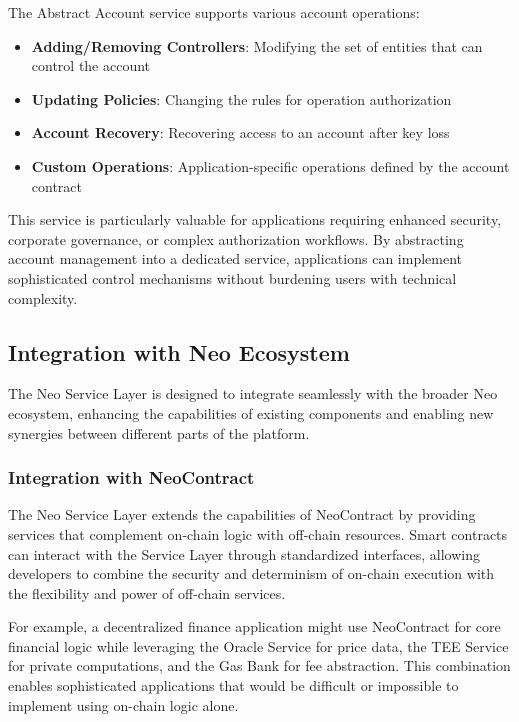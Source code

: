 The Abstract Account service supports various account operations:

\begin{itemize}
    \item \textbf{Adding/Removing Controllers}: Modifying the set of entities that can control the account
    \item \textbf{Updating Policies}: Changing the rules for operation authorization
    \item \textbf{Account Recovery}: Recovering access to an account after key loss
    \item \textbf{Custom Operations}: Application-specific operations defined by the account contract
\end{itemize}

This service is particularly valuable for applications requiring enhanced security, corporate governance, or complex authorization workflows. By abstracting account management into a dedicated service, applications can implement sophisticated control mechanisms without burdening users with technical complexity.

\subsection{Integration with Neo Ecosystem}
\label{subsec:nsl-integration}

The Neo Service Layer is designed to integrate seamlessly with the broader Neo ecosystem, enhancing the capabilities of existing components and enabling new synergies between different parts of the platform.



\subsubsection{Integration with NeoContract}
\label{subsubsec:neocontract-integration}

The Neo Service Layer extends the capabilities of NeoContract by providing services that complement on-chain logic with off-chain resources. Smart contracts can interact with the Service Layer through standardized interfaces, allowing developers to combine the security and determinism of on-chain execution with the flexibility and power of off-chain services.

For example, a decentralized finance application might use NeoContract for core financial logic while leveraging the Oracle Service for price data, the TEE Service for private computations, and the Gas Bank for fee abstraction. This combination enables sophisticated applications that would be difficult or impossible to implement using on-chain logic alone.

